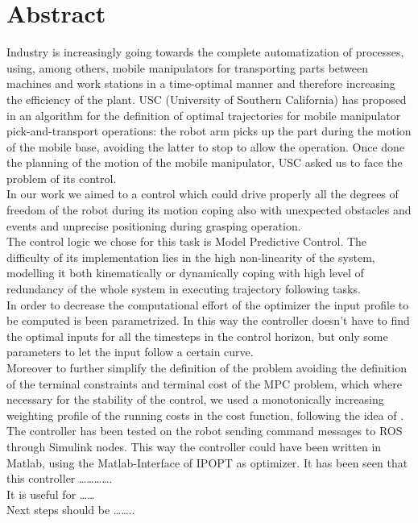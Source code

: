 	\newpage
\chapter*{Abstract}


Industry is increasingly going towards the complete automatization of processes, using, among others, mobile manipulators for transporting parts between machines and work stations in a time-optimal manner and therefore increasing the efficiency of the plant. 
USC (University of Southern California) has proposed in \cite{shantanuthakar} an algorithm for the definition of optimal trajectories for mobile manipulator pick-and-transport operations: the robot arm picks up the part during the motion of the mobile base, avoiding the latter to stop to allow the operation.
Once done the planning of the motion of the mobile manipulator, USC asked us to face the problem of its control.\\
In our work we aimed to a control which could drive properly all the degrees of freedom of the robot during its motion coping also with unexpected obstacles and events and unprecise positioning during grasping operation.\\
The control logic we chose for this task is Model Predictive Control. The difficulty of its implementation lies in the high non-linearity of the system, modelling it both kinematically or dynamically coping with high level of redundancy of the whole system in executing trajectory following tasks.\\
In order to decrease the computational effort of the optimizer the input profile to be computed is been parametrized. In this way the controller doesn’t have to find the optimal inputs for all the timesteps in the control horizon, but only some parameters to let the input follow a certain curve. \\
Moreover to further simplify the definition of the problem avoiding the definition of the terminal constraints and terminal cost of the MPC problem, which where necessary for the stability of the control, we used a monotonically increasing weighting profile of the running costs in the cost function, following the idea of \cite{alamir2018stability}.\\
The controller has been tested on the robot sending command messages to ROS through Simulink nodes. This way the controller could have been written in Matlab, using the Matlab-Interface of IPOPT as optimizer.
It has been seen that this controller ………….\\
It is useful for ……\\
Next steps should be ……..\\


\vspace{0.5cm}
\noindent 
